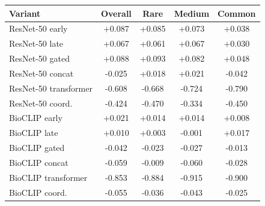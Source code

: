 \begin{tabular}{lcccc}
\toprule
Variant & Overall & Rare & Medium & Common \\
\midrule
ResNet-50
early & +0.087 & +0.085 & +0.073 & +0.038 \\
ResNet-50
late & +0.067 & +0.061 & +0.067 & +0.030 \\
ResNet-50
gated & +0.088 & +0.093 & +0.082 & +0.048 \\
ResNet-50
concat & -0.025 & +0.018 & +0.021 & -0.042 \\
ResNet-50
transformer & -0.608 & -0.668 & -0.724 & -0.790 \\
ResNet-50
coord. & -0.424 & -0.470 & -0.334 & -0.450 \\
BioCLIP
early & +0.021 & +0.014 & +0.014 & +0.008 \\
BioCLIP
late & +0.010 & +0.003 & -0.001 & +0.017 \\
BioCLIP
gated & -0.042 & -0.023 & -0.027 & -0.013 \\
BioCLIP
concat & -0.059 & -0.009 & -0.060 & -0.028 \\
BioCLIP
transformer & -0.853 & -0.884 & -0.915 & -0.900 \\
BioCLIP
coord. & -0.055 & -0.036 & -0.043 & -0.025 \\
\bottomrule
\end{tabular}

